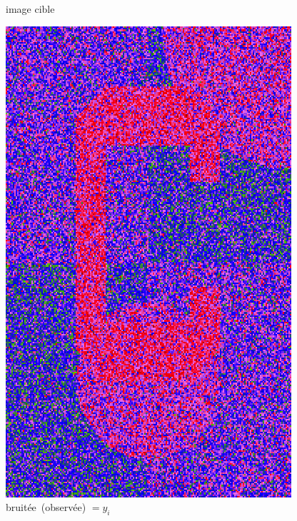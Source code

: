 \documentclass[12pt]{beamer}
\begin{document}
\begin{frame}
\begin{itemize}
\begin{frame}
\begin{center}
\begin{minipage}[t]{0.2\textwidth}
{\small image cible}
\end{minipage}
\hfill
\begin{minipage}[t]{0.2\textwidth}
\includegraphics[width=\textwidth]{c_noisy.png} \\
{\small \mbox{bruitée (observée)} $= y_i$}
\end{minipage}
\hfill
\begin{minipage}[t]{0.2\textwidth}

\end{minipage}
\end{center}
\end{frame}
\end{itemize}
\end{frame}
\end{document}
